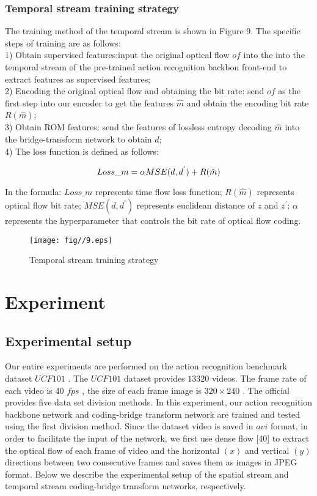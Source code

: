 \documentclass[a4paper]{cas-sc}
\begin{document}
\subsubsection{Temporal stream training strategy}
The training method of the temporal stream is shown in Figure 9. 
The specific steps of training are as follows:\\
1) Obtain supervised features:input the original optical flow $of$ into the into the temporal stream of the 
pre-trained action recognition backbon front-end to extract features as supervised features;\\
2) Encoding the original optical flow and obtaining the bit rate: 
send $of$ as the first step into our encoder to get the features $\hat{m}$ and obtain the encoding bit rate $R(\hat{m})$;\\
3) Obtain ROM features: 
send the features of lossless entropy decoding $\hat{m}$ into the bridge-transform network to obtain $d$;\\
4) The loss function is defined as follows:

\begin{equation}
  \centering
    Loss\_m=\alpha{MSE}(d,d^{'})+R(\hat{m})
\end{equation}

In the formula: $Loss\_m$ represents time flow loss function; 
$R(\hat{m})$ represents optical flow bit rate; 
$MSE(d,d^{'})$ represents euclidean distance of $z$ and $z^{'}$;  
$\alpha$ represents the hyperparameter that controls the bit rate of optical flow coding.\\                          

\begin{figure}[ht]
	\centering
		\texttt{[image: fig//9.eps]}
	  \caption{Temporal stream training strategy}\label{fig.9}
\end{figure}

\section{Experiment}
\subsection{Experimental setup}
Our entire experiments are performed on the action recognition benchmark dataset $UCF101$ \cite{soomro2012ucf101}. 
The $UCF101$ dataset provides $13320$ videos. 
The frame rate of each video is 40 $fps$ , 
the size of each frame image is $320\times240$ . 
The official provides five data set division methods. 
In this experiment, our action recognition backbone network and coding-bridge transform network are trained and tested 
using the first division method. 
Since the dataset video is saved in $avi$ format, in order to facilitate the input of the network, 
we first use dense flow [40] to extract the optical flow of each frame of video and the horizontal $(x)$ and vertical $(y)$ 
directions between two consecutive frames and saves them as images in JPEG format. 
Below we describe the experimental setup of the spatial stream and temporal stream coding-bridge transform networks, respectively.\\
\end{document}
